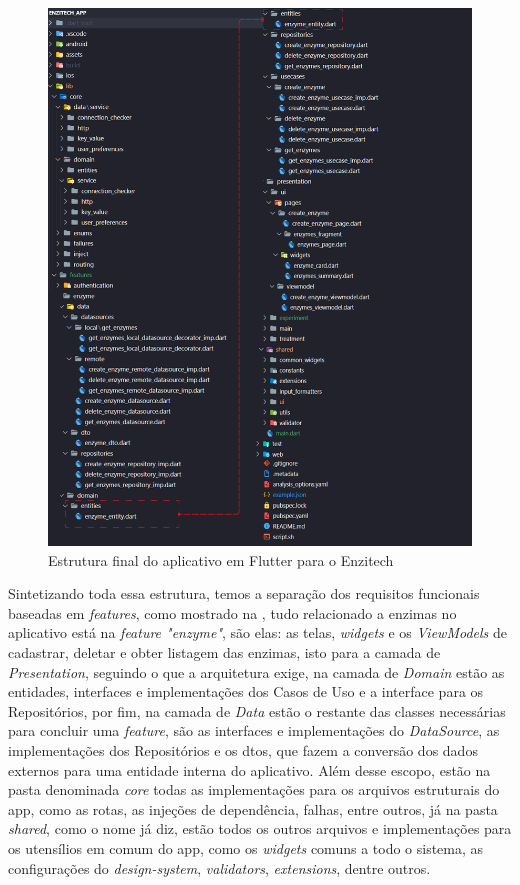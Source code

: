  \begin{figure}[H]
\centering
  \includegraphics[width=0.85\columnwidth]{images/estrutura_app_final.png}
  \caption{Estrutura final do aplicativo em Flutter para o Enzitech}
  \label{fig:estrutura_app_final}
\end{figure}

Sintetizando toda essa estrutura, temos a separação dos requisitos funcionais baseadas em \textit{features}, como mostrado na , tudo relacionado a enzimas no aplicativo está na \textit{feature "enzyme"}, são elas: as telas, \textit{widgets} e os \textit{ViewModels} de cadastrar, deletar e obter listagem das enzimas, isto para a camada de \textit{Presentation}, seguindo o que a arquitetura exige, na camada de \textit{Domain} estão as entidades, interfaces e implementações dos Casos de Uso e a interface para os Repositórios, por fim, na camada de \textit{Data} estão o restante das classes necessárias para concluir uma \textit{feature}, são as interfaces e implementações do \textit{DataSource}, as implementações dos Repositórios e os \acp{dto}, que fazem a conversão dos dados externos para uma entidade interna do aplicativo. Além desse escopo, estão na pasta denominada \textit{core} todas as implementações para os arquivos estruturais do \ac{app}, como as rotas, as injeções de dependência, falhas, entre outros, já na pasta \textit{shared}, como o nome já diz, estão todos os outros arquivos e implementações para os utensílios em comum do \ac{app}, como os \textit{widgets} comuns a todo o sistema, as configurações do \textit{design-system}, \textit{validators}, \textit{extensions}, dentre outros.

